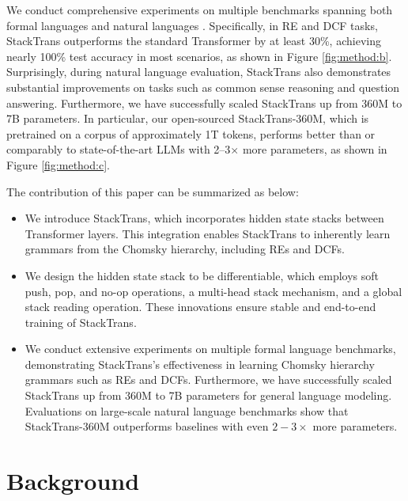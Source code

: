 \documentclass{article}
\DeclareRobustCommand{\method}{{\sc StackTrans}\xspace}
\begin{document}
 
We conduct comprehensive experiments on multiple benchmarks spanning both formal languages \citep{deletang2022neural} and natural languages \citep{groeneveld2024olmo}.
Specifically, in RE and DCF tasks, \method outperforms the standard Transformer by at least 30\%, achieving nearly 100\% test accuracy in most scenarios, as shown in Figure \ref{fig:method:b}.
Surprisingly, during natural language evaluation, \method also demonstrates substantial improvements on tasks such as common sense reasoning and question answering. 
Furthermore, we have successfully scaled \method up from 360M to 7B parameters. 
In particular, our open-sourced \method-360M, which is pretrained on a corpus of approximately 1T tokens, performs better than or comparably to state-of-the-art LLMs with 2–3$\times$ more parameters, as shown in Figure \ref{fig:method:c}.



The contribution of this paper can be summarized as below:
\label{sec:introcontribution}
\begin{itemize}[leftmargin=10pt,
                itemsep=5pt,
                parsep=0pt
                ]
    \item[\ding{182}] We introduce \method, which incorporates hidden state stacks between Transformer layers. This integration enables \method to inherently learn grammars from the Chomsky hierarchy, including REs and DCFs.
    \item[\ding{183}] We design the hidden state stack to be differentiable, which employs soft push, pop, and no-op operations, a multi-head stack mechanism, and a global stack reading operation. These innovations ensure stable and end-to-end training of \method.
    \item[\ding{184}] We conduct extensive experiments on multiple formal language benchmarks, demonstrating \method's effectiveness in learning Chomsky hierarchy grammars such as REs and DCFs. Furthermore, we have successfully scaled \method up from 360M to 7B parameters for general language modeling. Evaluations on large-scale natural language benchmarks show that \method-360M outperforms baselines with even $2-3\times$ more parameters.
\end{itemize}

\section{Background}
\end{document}
